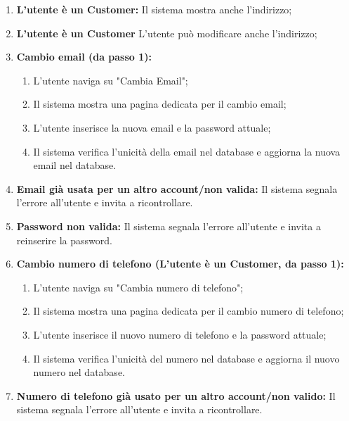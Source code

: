 \documentclass[border=10pt]{standalone}
\begin{document}
    {
        \begin{enumerate}[nosep, leftmargin=25px]
            \item[\textbf{2a.}] \textbf{L'utente è un Customer:} Il sistema mostra anche l'indirizzo;
            \item[\textbf{3a.}] \textbf{L'utente è un Customer} L'utente può modificare anche l'indirizzo; 
            \item[\textbf{1a.}] \textbf{Cambio email (da passo 1):}
            \begin{enumerate}[nosep, leftmargin=*]
                \item[i.] L'utente naviga su "Cambia Email"; 
                \item[ii.] Il sistema mostra una pagina dedicata per il cambio email;
                \item[iii.] L'utente inserisce la nuova email e la password attuale; 
                \item[iv.] Il sistema verifica l'unicità della email nel database e aggiorna la nuova email nel database.
            \end{enumerate}
            \item[\textbf{1b-e.}] \textbf{Email già usata per un altro account/non valida:} Il sistema segnala l'errore all'utente e invita a ricontrollare.
            \item[\textbf{1b-e.}] \textbf{Password non valida:} Il sistema segnala l'errore all'utente e invita a reinserire la password.
            \item[\textbf{1c.}] \textbf{Cambio numero di telefono (L'utente è un Customer, da passo 1):} 
            \begin{enumerate}[nosep, leftmargin=*]
                \item[i.] L'utente naviga su "Cambia numero di telefono";
                \item[ii.] Il sistema mostra una pagina dedicata per il cambio numero di telefono;
                \item[iii.] L'utente inserisce il nuovo numero di telefono e la password attuale;
                \item[iv.] Il sistema verifica l'unicità del numero nel database e aggiorna il nuovo numero nel database.
            \end{enumerate}
            \item[\textbf{1c-e.}] \textbf{Numero di telefono già usato per un altro account/non valido:} Il sistema segnala l'errore all'utente e invita a ricontrollare.

\end{enumerate}}
\end{document}
